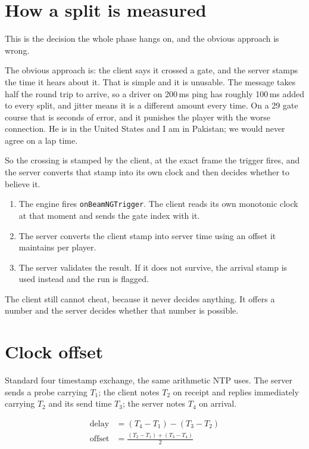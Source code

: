 \documentclass[11pt,a4paper]{article}
\newcommand{\code}[1]{\texttt{\small #1}}
\begin{document}
\section{How a split is measured}

This is the decision the whole phase hangs on, and the obvious approach is
wrong.

The obvious approach is: the client says it crossed a gate, and the server
stamps the time it hears about it. That is simple and it is unusable. The
message takes half the round trip to arrive, so a driver on 200\,ms ping has
roughly 100\,ms added to every split, and jitter means it is a different amount
every time. On a 29 gate course that is seconds of error, and it punishes the
player with the worse connection. He is in the United States and I am in
Pakistan; we would never agree on a lap time.

So the crossing is stamped by the client, at the exact frame the trigger fires,
and the server converts that stamp into its own clock and then decides whether
to believe it.

\begin{enumerate}
  \item The engine fires \code{onBeamNGTrigger}. The client reads its own
        monotonic clock at that moment and sends the gate index with it.
  \item The server converts the client stamp into server time using an offset
        it maintains per player.
  \item The server validates the result. If it does not survive, the arrival
        stamp is used instead and the run is flagged.
\end{enumerate}

The client still cannot cheat, because it never decides anything. It offers a
number and the server decides whether that number is possible.

\section{Clock offset}

Standard four timestamp exchange, the same arithmetic NTP uses. The server
sends a probe carrying $T_1$; the client notes $T_2$ on receipt and replies
immediately carrying $T_2$ and its send time $T_3$; the server notes $T_4$ on
arrival.

\begin{align*}
\text{delay}  &= (T_4 - T_1) - (T_3 - T_2) \\
\text{offset} &= \frac{(T_2 - T_1) + (T_3 - T_4)}{2}
\end{align*}
\end{document}
